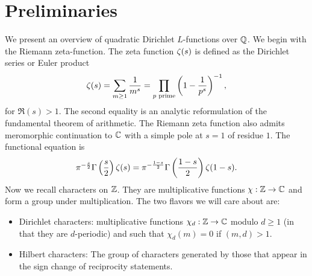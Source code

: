\section{Preliminaries}
    We present an overview of quadratic Dirichlet $L$-functions over $\mathbb{Q}$. We begin with the Riemann zeta-function. The zeta function $\zeta(s)$ is defined as the Dirichlet series or Euler product
    \[
        \zeta(s) = \sum_{m \ge 1}\frac{1}{m^{s}} = \prod_{\text{$p$ prime}}\left(1-\frac{1}{p^{s}}\right)^{-1},
    \]
    for $\Re(s) > 1$. The second equality is an analytic reformulation of the fundamental theorem of arithmetic. The Riemann zeta function also admits meromorphic continuation to $\mathbb{C}$ with a simple pole at $s = 1$ of residue $1$. The functional equation is
    \[
        \pi^{-\frac{s}{2}}\Gamma\left(\frac{s}{2}\right)\zeta(s) = \pi^{-\frac{1-s}{2}}\Gamma\left(\frac{1-s}{2}\right)\zeta(1-s).
    \]
    Now we recall characters on $\mathbb{Z}$. They are multiplicative functions $\chi:\mathbb{Z} \to \mathbb{C}$ and form a group under multiplication. The two flavors we will care about are:
    
    \begin{itemize}
        \item Dirichlet characters: multiplicative functions $\chi_{d}:\mathbb{Z} \to \mathbb{C}$ modulo $d \ge 1$ (in that they are $d$-periodic) and such that $\chi_{d}(m) = 0$ if $(m,d) > 1$.
        \item Hilbert characters: The group of characters generated by those that appear in the sign change of reciprocity statements.
    \end{itemize}
    
